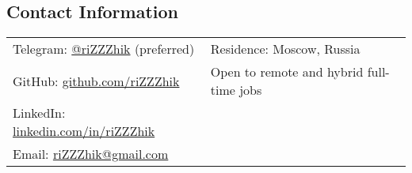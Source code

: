 \documentclass[margin,line]{res}
\begin{document}

\begin{resume}

\section{\sc Contact Information}

\vspace{.05in}
\begin{tabular}{@{}p{2.30in}p{3in}}
Telegram: \href{https://t.me/riZZZhik}{@riZZZhik} (preferred) & Residence: Moscow, Russia \\
GitHub: \href{https://github.com/riZZZhik}{github.com/riZZZhik} & Open to remote and hybrid full-time jobs\\
LinkedIn: \href{https://linkedin.com/in/rizzzhik}{linkedin.com/in/riZZZhik} \\
Email: \href{mailto:riZZZhik@gmail.com}{riZZZhik@gmail.com}
\end{tabular}





\end{resume}
\end{document}
